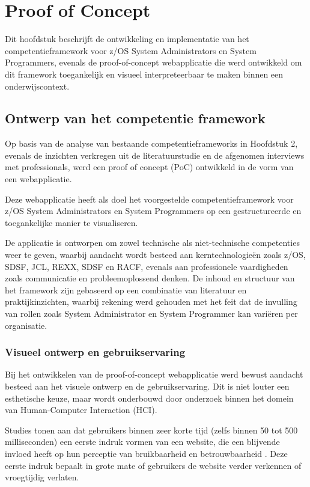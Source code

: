\chapter{Proof of Concept}
\label{ch:proof-of-concept}

Dit hoofdstuk beschrijft de ontwikkeling en implementatie van het competentieframework voor z/OS System Administrators en System Programmers, evenals de proof-of-concept webapplicatie die werd ontwikkeld om dit framework toegankelijk en visueel interpreteerbaar te maken binnen een onderwijscontext.

\section{Ontwerp van het competentie framework}
Op basis van de analyse van bestaande competentieframeworks in Hoofdstuk 2, evenals de inzichten verkregen uit de literatuurstudie en de afgenomen interviews met professionals, werd een proof of concept (PoC) ontwikkeld in de vorm van een webapplicatie.

Deze webapplicatie heeft als doel het voorgestelde competentieframework voor z/OS System Administrators en System Programmers op een gestructureerde en toegankelijke manier te visualiseren.

De applicatie is ontworpen om zowel technische als niet-technische competenties weer te geven, waarbij aandacht wordt besteed aan kerntechnologieën zoals z/OS, SDSF, JCL, REXX, SDSF en RACF, evenals aan professionele vaardigheden zoals communicatie en probleemoplossend denken. De inhoud en structuur van het framework zijn gebaseerd op een combinatie van literatuur en praktijkinzichten, waarbij rekening werd gehouden met het feit dat de invulling van rollen zoals System Administrator en System Programmer kan variëren per organisatie.

\subsection{Visueel ontwerp en gebruikservaring}

Bij het ontwikkelen van de proof-of-concept webapplicatie werd bewust aandacht besteed aan het visuele ontwerp en de gebruikservaring. Dit is niet louter een esthetische keuze, maar wordt onderbouwd door onderzoek binnen het domein van Human-Computer Interaction (HCI).

Studies tonen aan dat gebruikers binnen zeer korte tijd (zelfs binnen 50 tot 500 milliseconden) een eerste indruk vormen van een website, die een blijvende invloed heeft op hun perceptie van bruikbaarheid en betrouwbaarheid \autocite{reinecke2013firstimpression}. Deze eerste indruk bepaalt in grote mate of gebruikers de website verder verkennen of vroegtijdig verlaten.


